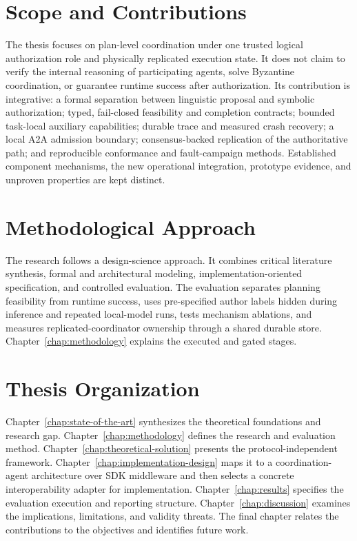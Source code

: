 \section{Scope and Contributions}

The thesis focuses on plan-level coordination under one trusted logical authorization role and physically replicated execution state. It does not claim to verify the internal reasoning of participating agents, solve Byzantine coordination, or guarantee runtime success after authorization. Its contribution is integrative: a formal separation between linguistic proposal and symbolic authorization; typed, fail-closed feasibility and completion contracts; bounded task-local auxiliary capabilities; durable trace and measured crash recovery; a local A2A admission boundary; consensus-backed replication of the authoritative path; and reproducible conformance and fault-campaign methods. Established component mechanisms, the new operational integration, prototype evidence, and unproven properties are kept distinct.

\section{Methodological Approach}

The research follows a design-science approach. It combines critical literature synthesis, formal and architectural modeling, implementation-oriented specification, and controlled evaluation. The evaluation separates planning feasibility from runtime success, uses pre-specified author labels hidden during inference and repeated local-model runs, tests mechanism ablations, and measures replicated-coordinator ownership through a shared durable store. Chapter~\ref{chap:methodology} explains the executed and gated stages.

\section{Thesis Organization}

Chapter~\ref{chap:state-of-the-art} synthesizes the theoretical foundations and research gap. Chapter~\ref{chap:methodology} defines the research and evaluation method. Chapter~\ref{chap:theoretical-solution} presents the protocol-independent framework. Chapter~\ref{chap:implementation-design} maps it to a coordination-agent architecture over SDK middleware and then selects a concrete interoperability adapter for implementation. Chapter~\ref{chap:results} specifies the evaluation execution and reporting structure. Chapter~\ref{chap:discussion} examines the implications, limitations, and validity threats. The final chapter relates the contributions to the objectives and identifies future work.
